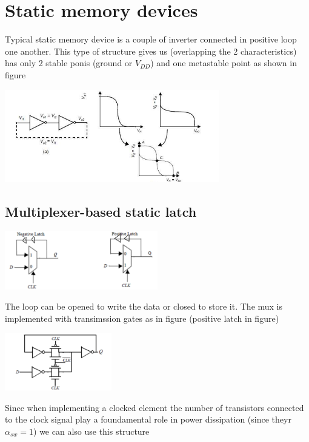 \section{Static memory devices}

Typical static memory device is a couple of inverter connected in positive loop one another. This type of structure gives us (overlapping the 2 characteristics) has only 2 stable ponis (ground or $V_{DD}$) and one metastable point as shown in figure

\centering
\includegraphics[width=0.7\textwidth]{C10_7.png}\\
\raggedright

\subsection{Multiplexer-based static latch}

\centering
\includegraphics[width=0.5\textwidth]{C10_8.png}\\
\raggedright

The loop can be opened to write the data or closed to store it. The mux is implemented with transimssion gates as in figure (positive latch in figure)

\centering
\includegraphics[width=0.35\textwidth]{C10_9.png}\\
\raggedright

Since when implementing a clocked element the number of transistors connected to the clock signal play a foundamental role in power dissipation (since theyr $\alpha_{sw}=1$) we can also use this structure

